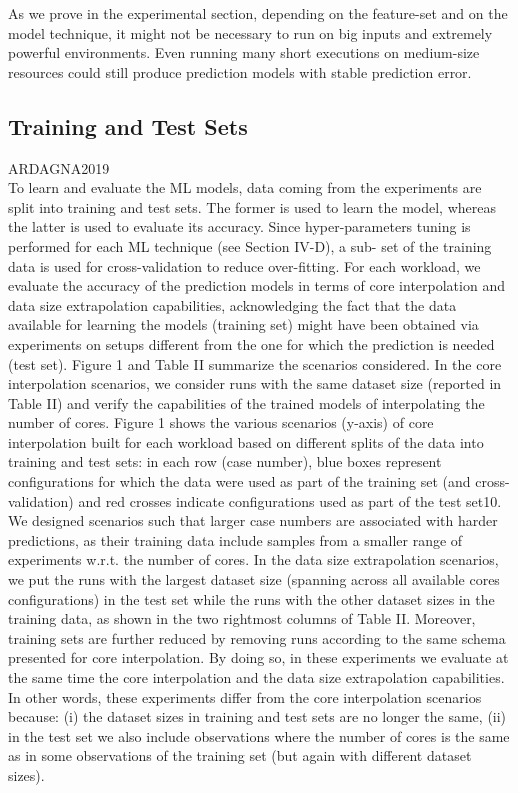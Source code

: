\documentclass[a4paper, 10pt, conference]{ieeeconf}      %
\begin{document}
As we prove in the experimental section, depending on the feature-set and on the model technique, it might not be necessary to run on big inputs and extremely powerful environments. Even running many short executions on medium-size resources could still produce prediction models with stable prediction error.


\subsection{Training and Test Sets}

ARDAGNA2019\\
\color{blue}
To learn and evaluate the ML models, data coming from the experiments are split into training and test sets. The former is used to learn the model, whereas the latter is used to evaluate its accuracy. Since hyper-parameters tuning is performed for each ML technique (see Section IV-D), a sub- set of the training data is used for cross-validation to reduce over-fitting. For each workload, we evaluate the accuracy of the prediction models in terms of core interpolation and data size extrapolation capabilities, acknowledging the fact that the data available for learning the models (training set) might have been obtained via experiments on setups different from the one for which the prediction is needed (test set). Figure 1 and Table II summarize the scenarios considered.
In the core interpolation scenarios, we consider runs with the same dataset size (reported in Table II) and verify the capabilities of the trained models of interpolating the number of cores. Figure 1 shows the various scenarios (y-axis) of core interpolation built for each workload based on different splits of the data into training and test sets: in each row (case number), blue boxes represent configurations for which the data were used as part of the training set (and cross- validation) and red crosses indicate configurations used as part of the test set10. We designed scenarios such that larger case numbers are associated with harder predictions, as their training data include samples from a smaller range of experiments w.r.t. the number of cores. In the data size extrapolation scenarios, we put the runs with the largest dataset size (spanning across all available cores configurations) in the test set while the runs with the other dataset sizes in the training data, as shown in the two rightmost columns of Table II. Moreover, training sets are further reduced by removing runs according to the same schema presented for core interpolation. By doing so, in these experiments we evaluate at the same time the core interpolation and the data size extrapolation capabilities. In other words, these experiments differ from the core interpolation scenarios because: (i) the dataset sizes in training and test sets are no longer the same, (ii) in the test set we also include observations where the number of cores is the same as in some observations of the training set (but again with different dataset sizes).
\color{black}
\end{document}

